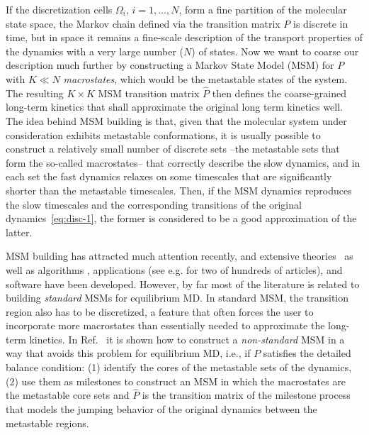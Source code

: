 \documentclass[journal=jctcce,manuscript=article]{achemso}
\newcommand{\vect}[1]{#1}
\begin{document}
If the discretization cells $\Omega_i$, $i=1,\ldots,N$, form a fine
partition of the molecular state space, the Markov chain defined via
the transition matrix $P$
 is discrete in time, but in space it remains a fine-scale description of the transport properties of the
dynamics with a very large number ($N$) of states.  Now we want to coarse our description much further by
constructing a Markov State Model (MSM) for $\vect P$ with $K\ll N$
\emph{macrostates}, which would be the metastable states of the system. The resulting $K\times K$ MSM transition matrix $\hat{\vect P}$
then defines the coarse-grained long-term kinetics that shall
approximate the original long term kinetics well. 
The idea behind MSM building is that, given that the molecular system under consideration exhibits metastable conformations,  it is usually possible to construct a
relatively small number of discrete sets --the metastable sets that form the so-called macrostates-- that
correctly describe the slow  dynamics, and 
in each set the fast dynamics relaxes on some timescales that are significantly shorter than the metastable timescales.
Then, if the MSM dynamics reproduces the slow timescales and the corresponding transitions
of the original dynamics~\eqref{eq:disc-1},
the former is considered to be a good approximation of the latter.

MSM building has attracted much attention recently, and extensive theories~\cite{A19-31} as well as algorithms \cite{A19-1}, applications (see e.g. \cite{A19-26,PNAS09} for two of hundreds of articles), and software \cite{A19-49, MSMBuilder} have been developed. However, 
by far most of the literature is related to building \emph{standard} MSMs for equilibrium MD. In standard MSM, the transition region also has to be discretized, a feature that often forces the user to incorporate more macrostates than essentially needed to approximate the long-term kinetics.
In Ref.~\cite{sarich2010approximation, A19-31,schuette2011markov,BucheteHummer} it is shown how to construct a \emph{non-standard} MSM in a way that avoids this problem for equilibrium MD, i.e., if $\vect P$ satisfies the detailed balance
condition: (1) identify the cores of the metastable sets of the
dynamics, (2) use them as milestones to construct an MSM in which the
macrostates are the metastable core sets and $\hat{\vect P}$ is the transition
matrix of the milestone process \cite{A19-31,schuette2011markov,A19-29} that models the jumping behavior of
the original dynamics between the metastable regions. 
\end{document}
